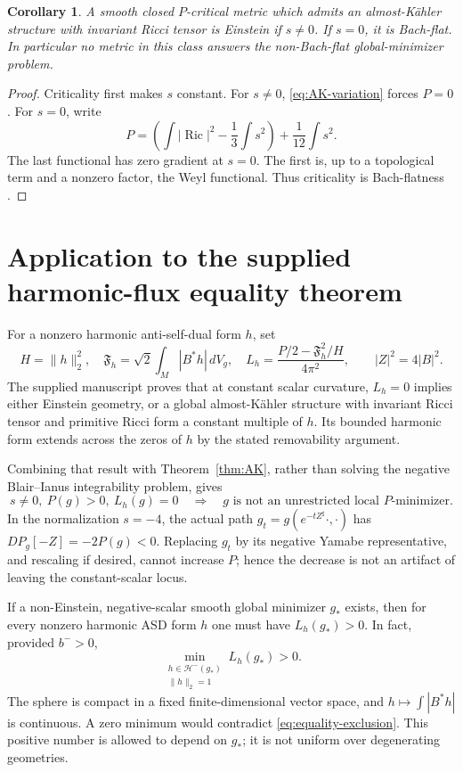 \documentclass[11pt,a4paper]{article}
\newtheorem{corollary}[theorem]{Corollary}
\theoremstyle{remark}\newtheorem{remark}[theorem]{Remark}
\newcommand{\Ric}{\operatorname{Ric}}
\numberwithin{equation}{section}
\begin{document}
\begin{corollary}\label{cor:critical}
A smooth closed $P$-critical metric which admits an almost-K\"ahler
structure with invariant Ricci tensor is Einstein if $s\ne0$.
If $s=0$, it is Bach-flat. In particular no metric in this class
answers the non-Bach-flat global-minimizer problem.
\end{corollary}
\begin{proof}
Criticality first makes $s$ constant. For $s\ne0$,
\eqref{eq:AK-variation} forces $P=0$.
For $s=0$, write
\[
 P=\left(\int|\Ric|^2-\frac13\int s^2\right)
                    +\frac1{12}\int s^2.
\]
The last functional has zero gradient at $s=0$. The first is,
up to a topological term and a nonzero factor, the Weyl functional.
Thus criticality is Bach-flatness \cite[Section 1.4]{GV}.
\end{proof}

\section{Application to the supplied harmonic-flux equality theorem}
For a nonzero harmonic anti-self-dual form $h$, set
\[
 H=\|h\|_2^2,\quad \mathfrak F_h=\sqrt2\int_M|B^*h|\,dV_g,
 \quad L_h=\frac{P/2-\mathfrak F_h^2/H}{4\pi^2},
 \qquad |Z|^2=4|B|^2.
\]
The supplied manuscript \cite[Section 3.2]{Source} proves that at
constant scalar curvature, $L_h=0$ implies either Einstein geometry,
or a global almost-K\"ahler structure with invariant Ricci tensor and
primitive Ricci form a constant multiple of $h$. Its bounded harmonic
form extends across the zeros of $h$ by the stated removability argument.

Combining that result with Theorem~\ref{thm:AK}, rather than solving
the negative Blair--Ianus integrability problem, gives
\begin{equation}\label{eq:equality-exclusion}
 \boxed{s\ne0,\ P(g)>0,\ L_h(g)=0
     \quad\Longrightarrow\quad
     g\text{ is not an unrestricted local }P\text{-minimizer}.}
\end{equation}
In the normalization $s=-4$, the actual path $g_t=g(e^{-tZ^\sharp}\cdot,\cdot)$
has $DP_g[-Z]=-2P(g)<0$. Replacing $g_t$ by its negative Yamabe
representative, and rescaling if desired, cannot increase $P$; hence
the decrease is not an artifact of leaving the constant-scalar locus.

If a non-Einstein, negative-scalar smooth global minimizer $g_*$ exists,
then for every nonzero harmonic ASD form $h$ one must have $L_h(g_*)>0$.
In fact, provided $b^->0$,
\begin{equation}\label{eq:fixed-gap}
 \min_{\substack{h\in\mathcal H^-(g_*)\\\|h\|_2=1}}L_h(g_*)>0.
\end{equation}
The sphere is compact in a fixed finite-dimensional vector space, and
$h\mapsto\int|B^*h|$ is continuous. A zero minimum would contradict
\eqref{eq:equality-exclusion}. This positive number is allowed to
depend on $g_*$; it is not uniform over degenerating geometries.
\end{document}
